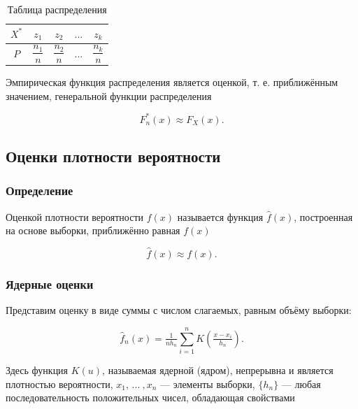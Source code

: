 \documentclass[a4paper,14pt]{article}
\begin{document}
	\begin{table}[h!]
		\begin{center}
			\begin{tabular}{|c|c|c|c|c|}
				\hline
				$X^*$ & $z_1$ & $z_2$ & $...$ & $z_k$ \\
				\hline
				$P$ & $\dfrac{n_1}{n}$ & $\dfrac{n_2}{n}$ & $...$ & $\dfrac{n_k}{n}$ \\
				\hline
			\end{tabular}
		\end{center}
		\caption{Таблица распределения}
	\end{table}
	
	Эмпирическая функция распределения является оценкой, т. е. приближённым значением, генеральной функции распределения
	
	\begin{equation}
		F_n^*(x) \approx F_X(x).
	\end{equation}
	
	\subsection{Оценки плотности вероятности}
	
	\subsubsection{Определение}
	
	Оценкой плотности вероятности $f(x)$ называется функция $\widehat{f}(x)$, построенная на основе выборки, приближённо равная $f(x)$
	
	\begin{equation}
		\widehat{f}(x) \approx f(x).
	\end{equation}
	
	\subsubsection{Ядерные оценки}
	
	Представим оценку в виде суммы с числом слагаемых, равным объёму выборки:
	
	\begin{equation}
		\widehat{f}_n(x) = \tfrac{1}{nh_n}\sum\limits_{i=1}^n K\left( \tfrac{x - x_i}{h_n} \right).
	\end{equation}
	
	Здесь функция $K(u)$, называемая ядерной (ядром), непрерывна и является плотностью вероятности, $x_1, \, ... \: , x_n$ --- элементы выборки, $\{h_n\}$ --- любая последовательность положительных чисел, обладающая свойствами
	
\end{document}
